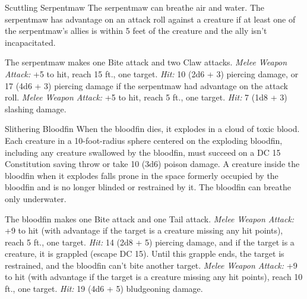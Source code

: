 \documentclass[10pt,a4paper,twoside,twocolumn,openany,bg=none,nodeprecatedcode]{dndbook}
\begin{document}
\begin{DndMonster}[float*=t]{Scuttling Serpentmaw}
\DndMonsterBasics[
armor-class = {17 (natural armor)},
hit-points = {\DndDice{10d6 + 30}},
speed = {30 ft.}
]
\DndMonsterAbilityScores[
 str = 16,
 dex = 14,
 con = 16,
 int = 3,
 wis = 11,
 cha = 3
]
\DndMonsterDetails[
skills = {Stealth +6},
senses = {blindsight 60 ft. (blind beyond this radius), passive perception 10},
challenge = 4,
]
The serpentmaw can breathe air and water.
The serpentmaw has advantage on an attack roll against a creature if at least one of the serpentmaw's allies is within 5 feet of the creature and the ally isn't incapacitated.
\par
{}
The serpentmaw makes one Bite attack and two Claw attacks.
\textsl{Melee Weapon Attack:} +5 to hit, reach 15 ft., one target. \textsl{Hit:} 10 (2d6 + 3) piercing damage, or 17 (4d6 + 3) piercing damage if the serpentmaw had advantage on the attack roll.
\textsl{Melee Weapon Attack:} +5 to hit, reach 5 ft., one target. \textsl{Hit:} 7 (1d8 + 3) slashing damage.
\end{DndMonster}




\begin{DndMonster}[float*=t]{Slithering Bloodfin}
\DndMonsterBasics[
armor-class = {16 (natural armor)},
hit-points = {\DndDice{11d10 + 33}},
speed = {5 ft., 50 ft. (key)}
]
\DndMonsterAbilityScores[
 str = 20,
 dex = 14,
 con = 16,
 int = 2,
 wis = 10,
 cha = 3
]
\DndMonsterDetails[
skills = {Perception +4},
damage-immunities = {poison},
senses = {blindsight 100 ft. (blind beyond this radius), passive perception 14},
challenge = 9,
]
When the bloodfin dies, it explodes in a cloud of toxic blood. Each creature in a 10-foot-radius sphere centered on the exploding bloodfin, including any creature swallowed by the bloodfin, must succeed on a DC 15 Constitution saving throw or take 10 (3d6) poison damage. A creature inside the bloodfin when it explodes falls prone in the space formerly occupied by the bloodfin and is no longer blinded or restrained by it.
The bloodfin can breathe only underwater.
\par
{}
The bloodfin makes one Bite attack and one Tail attack.
\textsl{Melee Weapon Attack:} +9 to hit (with advantage if the target is a creature missing any hit points), reach 5 ft., one target. \textsl{Hit:} 14 (2d8 + 5) piercing damage, and if the target is a creature, it is grappled (escape DC 15). Until this grapple ends, the target is restrained, and the bloodfin can't bite another target.
\textsl{Melee Weapon Attack:} +9 to hit (with advantage if the target is a creature missing any hit points), reach 10 ft., one target. \textsl{Hit:} 19 (4d6 + 5) bludgeoning damage.
\end{DndMonster}
\end{document}
